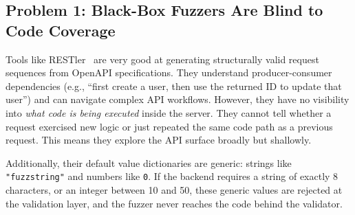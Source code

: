 \documentclass[conference]{IEEEtran}
\begin{document}
\begin{table}[htbp]
\caption{Comparison of API Fuzzing Approaches}
\label{tab:approach_comparison}
\centering
\footnotesize
{}
\end{table}

\subsection{Problem 1: Black-Box Fuzzers Are Blind to Code Coverage}

Tools like RESTler~\cite{restler_icse19} are very good at generating structurally valid request sequences from OpenAPI specifications. They understand producer-consumer dependencies (e.g., ``first create a user, then use the returned ID to update that user'') and can navigate complex API workflows. However, they have no visibility into \emph{what code is being executed} inside the server. They cannot tell whether a request exercised new logic or just repeated the same code path as a previous request. This means they explore the API surface broadly but shallowly.

Additionally, their default value dictionaries are generic: strings like \texttt{"fuzzstring"} and numbers like \texttt{0}. If the backend requires a string of exactly 8 characters, or an integer between 10 and 50, these generic values are rejected at the validation layer, and the fuzzer never reaches the code behind the validator.
\end{document}
